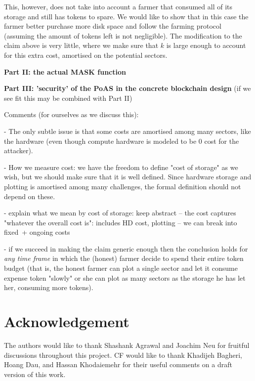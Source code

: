 \documentclass[12pt, onecolumn]{IEEEtran}
\begin{document}
This, however, does not take into account a farmer that consumed all of its storage and still has tokens to spare. We would like to show that in this case the farmer better purchase more disk space and follow the farming protocol (assuming the amount of tokens left is not negligible). The modification to the claim above is very little, where we make sure that $k$ is large enough to account for this extra cost, amortised on the potential sectors.




\textbf{Part II: the actual MASK function}



\textbf{Part III: 'security' of the PoAS in the concrete blockchain design}
(if we see fit this may be combined with Part II)


Comments (for ourselves as we discuss this):

- The only subtle issue is that some costs are amortised among many sectors, like the hardware (even though compute hardware is modeled to be 0 cost for the attacker).

- How we measure cost: we have the freedom to define "cost of storage" as we wish, but we should make sure that it is well defined. Since hardware storage and plotting is amortised among many challenges, the formal definition should not depend on these.

- explain what we mean by cost of storage: keep abstract -- the cost captures "whatever the overall cost is": includes HD cost, plotting -- we can break into fixed + ongoing costs

- if we succeed in making the claim generic enough then the conclusion holds for \textit{any time frame} in which the (honest) farmer decide to spend their entire token budget (that is, the honest farmer can plot a single sector and let it consume expense token "slowly" or she can plot as many sectors as the storage he has let her, consuming more tokens).

\section*{Acknowledgement}
The authors would like to thank Shashank Agrawal and Joachim Neu for fruitful discussions throughout this project. CF would like to thank Khadijeh Bagheri,  Hoang Dau, and Hassan Khodaiemehr for their useful comments on a draft version of this work.
\end{document}
